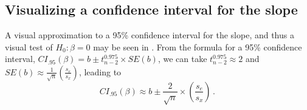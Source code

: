 \subsection{Visualizing a confidence interval for the slope}
A visual approximation to a 95\% confidence interval for the slope, and thus a visual test of $H_0 : \beta = 0$
may be seen in .  From the formula for a 95\% confidence interval,
$CI_{.95} (\beta) = b \pm t_{n-2}^{0.975} \times SE(b)$, we can take $t_{n-2}^{0.975} \approx 2$
and 
 $SE(b) \approx \frac{1}{\sqrt{n}}\left( \frac{s_e}{s_x} \right)$, 
leading to
\begin{equation}\label{eq:ci-approx}
CI_{.95} (\beta) \approx b \pm \frac{2}{\sqrt{n}} \times \left( \frac{s_e}{s_x} \right) \period
\end{equation}
